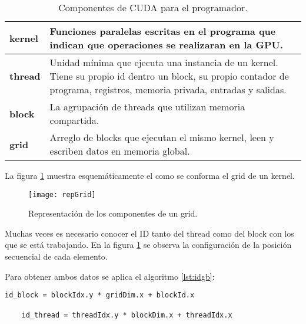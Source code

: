      \begin{table}[h!]
      \begin{center}
            \footnotesize
        \begin{tabular}{|m{1.5cm}|m{8.5cm}|}
         \hline
         \cellcolor{lightgray}\textbf{kernel} & Funciones paralelas escritas en el programa que indican que operaciones se realizaran en la GPU.\\ 
         \hline
          \cellcolor{lightgray}\textbf{thread} & Unidad mínima que ejecuta una instancia de un kernel. Tiene su propio id dentro un block, su propio contador de programa, registros, memoria privada, entradas y salidas.\\ 
         \hline  
         \cellcolor{lightgray}\textbf{block} & La agrupación de threads que utilizan memoria compartida.\\ 
         \hline
         \cellcolor{lightgray}\textbf{grid} & Arreglo de blocks que ejecutan el mismo kernel, leen y escriben datos en memoria global.\\ 
         \hline
           \end{tabular}
        \caption{Componentes de CUDA para el programador.}
        \label{tab:CUDAcomp}
      \end{center}
    \end{table}
    
    La figura \ref{fig:grid} muestra esquemáticamente el como se conforma el grid de un kernel.
    
    \begin{figure}[ht]
      \centering
        \texttt{[image: repGrid]}
        \caption{Representación de los componentes de un grid\cite{CUDAP}.}
        \label{fig:grid}
    \end{figure}
    
    Muchas veces es necesario conocer el ID tanto del thread como del block con los que se está trabajando. En la figura \ref{fig:grid} se observa la configuración de la posición secuencial de cada elemento.

    Para obtener ambos datos se aplica el algoritmo \ref{lst:idgb}:
    
    \begin{lstlisting}[style=CStyle, frame=single,label=lst:idgb,  basicstyle=\ttfamily\footnotesize, caption=Transformación para obtener id del thread y del block.] 
    id_block = blockIdx.y * gridDim.x + blockId.x
    
    id_thread = threadIdx.y * blockDim.x + threadIdx.x
    \end{lstlisting}
    
